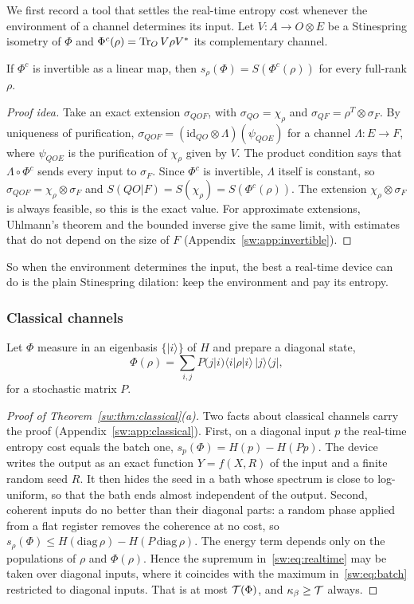 We first record a tool that settles the real-time entropy cost whenever the environment of a channel determines its input. Let $V:A\to O\otimes E$ be a Stinespring isometry of $\Phi$ and $\Phi^c(\rho)=\operatorname{Tr}_O V\rho V^*$ its complementary channel.

\begin{lemma}\label{sw:lem:invertible}
If $\Phi^c$ is invertible as a linear map, then $s_\rho(\Phi)=S(\Phi^c(\rho))$ for every full-rank $\rho$.
\end{lemma}

\begin{proof}[Proof idea]
Take an exact extension $\sigma_{QOF}$, with $\sigma_{QO}=\chi_\rho$ and $\sigma_{QF}=\rho^T\otimes\sigma_F$. By uniqueness of purification, $\sigma_{QOF}=(\mathrm{id}_{QO}\otimes\Lambda)(\psi_{QOE})$ for a channel $\Lambda:E\to F$, where $\psi_{QOE}$ is the purification of $\chi_\rho$ given by $V$. The product condition says that $\Lambda\circ\Phi^c$ sends every input to $\sigma_F$. Since $\Phi^c$ is invertible, $\Lambda$ itself is constant, so $\sigma_{QOF}=\chi_\rho\otimes\sigma_F$ and $S(QO|F)=S(\chi_\rho)=S(\Phi^c(\rho))$. The extension $\chi_\rho\otimes\sigma_F$ is always feasible, so this is the exact value. For approximate extensions, Uhlmann's theorem and the bounded inverse give the same limit, with estimates that do not depend on the size of $F$ (Appendix~\ref{sw:app:invertible}).
\end{proof}

So when the environment determines the input, the best a real-time device can do is the plain Stinespring dilation: keep the environment and pay its entropy.

\subsubsection{Classical channels}

Let $\Phi$ measure in an eigenbasis $\{|i\rangle\}$ of $H$ and prepare a diagonal state,
\[
\Phi(\rho)=\sum_{i,j}P(j|i)\langle i|\rho|i\rangle\,|j\rangle\langle j|,
\]
for a stochastic matrix $P$.

\begin{proof}[Proof of Theorem~\ref{sw:thm:classical}(a)]
Two facts about classical channels carry the proof (Appendix~\ref{sw:app:classical}). First, on a diagonal input $p$ the real-time entropy cost equals the batch one, $s_p(\Phi)=H(p)-H(Pp)$. The device writes the output as an exact function $Y=f(X,R)$ of the input and a finite random seed $R$. It then hides the seed in a bath whose spectrum is close to log-uniform, so that the bath ends almost independent of the output. Second, coherent inputs do no better than their diagonal parts: a random phase applied from a flat register removes the coherence at no cost, so $s_\rho(\Phi)\le H(\mathrm{diag}\,\rho)-H(P\,\mathrm{diag}\,\rho)$. The energy term depends only on the populations of $\rho$ and $\Phi(\rho)$. Hence the supremum in~\eqref{sw:eq:realtime} may be taken over diagonal inputs, where it coincides with the maximum in~\eqref{sw:eq:batch} restricted to diagonal inputs. That is at most $\mathcal T(\Phi)$, and $\kappa_\beta\ge\mathcal T$ always.
\end{proof}

